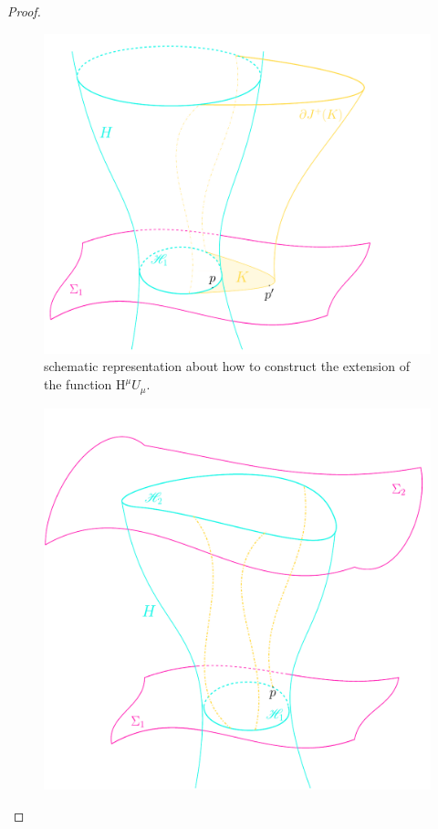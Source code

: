 \begin{proof}
	\begin{figure}
		\centering
		\includegraphics[scale=0.8]{Immagini/extension-area-theorem/extension-area-theorem.pdf}
		\caption[]{schematic representation about how to construct the extension of the function \(\mathrm{H}^{\mu}U_{\mu}\).}
		\label{fig:extension-area-theorem}
	\end{figure}
	\begin{figure}
		\centering
		\includegraphics[scale=0.37]{Immagini/flow-generators/flow-generators.pdf}

\end{figure}
\end{proof}
